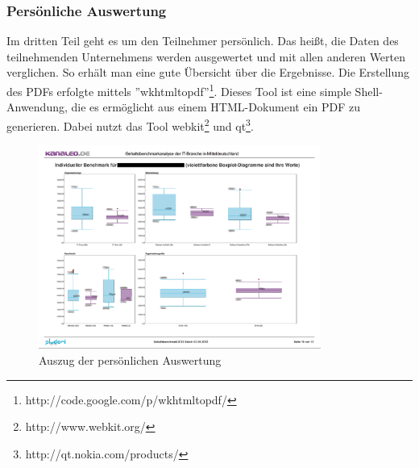 \subsubsection{Persönliche Auswertung}
Im dritten Teil geht es um den Teilnehmer persönlich. Das
heißt, die Daten des teilnehmenden Unternehmens werden ausgewertet und mit allen
anderen Werten verglichen. So erhält man eine gute Übersicht über die
Ergebnisse. Die Erstellung des PDFs erfolgte mittels
''wkhtmltopdf''\footnote{http://code.google.com/p/wkhtmltopdf/}. Dieses Tool
ist eine simple Shell-Anwendung, die es ermöglicht aus einem HTML-Dokument ein
PDF zu generieren. Dabei nutzt das Tool webkit\footnote{http://www.webkit.org/}
und qt\footnote{http://qt.nokia.com/products/}. 
\begin{figure}[htbp]
 \centering
 \includegraphics[width=350px]{./material/pers_auswertung.png}
 \caption{Auszug der persönlichen Auswertung}
 \label{fig:pers_auswertung}
\end{figure}
